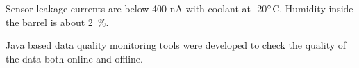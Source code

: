 Sensor leakage currents are below 400 nA with coolant at -20$\degree$C. Humidity inside the barrel is about 2~$\%$.


Java based data quality monitoring tools were developed to check the quality of the data both online and offline. 

